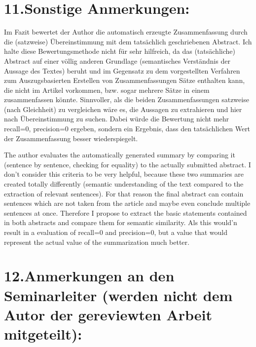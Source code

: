 \documentclass{article}
\begin{document}
\section{11.\hspace*{0.5em}Sonstige Anmerkungen:}\label{sec-sonstige-anmerkungen-}%

\noindent{}  Im Fazit bewertet der Author die automatisch erzeugte Zusammenfassung durch die (satzweise) Übereinstimmung mit dem tatsächlich geschriebenen Abstract. Ich halte diese Bewertungsmethode nicht für sehr hilfreich, da das (tatsächliche) Abstract auf einer völlig anderen Grundlage (semantisches Verständnis der Aussage des Textes) beruht und im Gegensatz zu dem vorgestellten Verfahren zum Auszugsbasierten Erstellen von Zusammenfassungen Sätze enthalten kann, die nicht im Artikel vorkommen, bzw. sogar mehrere Sätze in einem zusammenfassen könnte.
  Sinnvoller, als die beiden Zusammenfassungen satzweise (nach Gleichheit) zu vergleichen wäre es, die Aussagen zu extrahieren und hier nach Übereinstimmung zu suchen. Dabei würde die Bewertung nicht mehr recall=0, precision=0 ergeben, sondern ein Ergebnis, dass den tatsächlichen Wert der Zusammenfassung besser wiederspiegelt.%

\mdhr{}%

\noindent{}  The author evaluates the automatically generated summary by comparing it (sentence by sentence, checking for equality) to the actually submitted abstract. I don't consider this criteria to be very helpful, because these two summaries are created totally differently (semantic understanding of the text compared to the extraction of relevant sentences). For that reason the final abstract can contain sentences which are not taken from the article and maybe even conclude multiple sentences at once.
  Therefore I propose to extract the basic statements contained in both abstracts and compare them for semantic similarity. Als this would'n result in a evaluation of recall=0 and precision=0, but a value that would represent the actual value of the summarization much better.%

\section{12.\hspace*{0.5em}Anmerkungen an den Seminarleiter (werden nicht dem Autor der gereviewten Arbeit mitgeteilt):}\label{sec-anmerkungen-an-den-seminarleiter-werden-nicht-dem-autor-der-gereviewten-arbeit-mitgeteilt-}%
\end{document}
